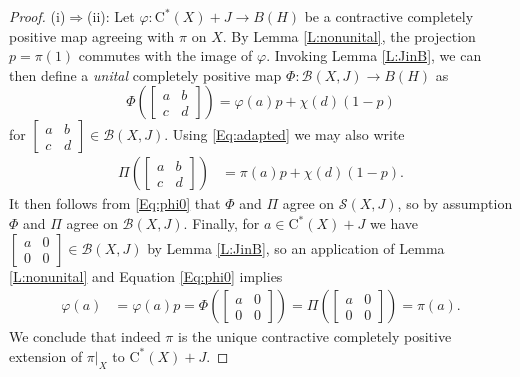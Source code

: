 \documentclass[10pt]{amsart}
\newcommand{\B}{{\mathcal{B}}}
\renewcommand{\S}{{\mathcal{S}}}
\newcommand{\rC}{\mathrm{C}}
\renewcommand{\phi}{\varphi}
\theoremstyle{definition}
\begin{document}
\begin{proof}
(i)$\Rightarrow$(ii):   Let $\phi:\rC^*(X)+J \to B(H)$ be a contractive completely positive map agreeing with $\pi$ on $X$. By Lemma \ref{L:nonunital}, the projection $p=\pi(1)$ commutes with the image of $\phi$.
Invoking Lemma \ref{L:JinB}, we can then define a \emph{unital} completely positive map $\Phi:\B(X,J)\to B(H)$ as
\begin{equation}\label{Eq:phi0}
\Phi\left(\begin{bmatrix}
a& b \\ c & d
\end{bmatrix}\right)=\phi(a)p+\chi(d)(1-p)
\end{equation}
 for $\begin{bmatrix}
a& b \\ c & d
\end{bmatrix}\in \B(X,J)$.
Using \eqref{Eq:adapted} we may also write
\begin{align*}
\Pi\left( \begin{bmatrix}
a& b \\ c & d
\end{bmatrix}\right)
&=\pi(a)p+\chi(d)(1-p).
\end{align*}
It then follows from \eqref{Eq:phi0} that $\Phi$ and $\Pi$ agree on $\S(X,J)$, so by assumption $\Phi$ and $\Pi$ agree on $\B(X,J)$. 
Finally, for $a\in \rC^*(X)+J$ we have $\begin{bmatrix}
a& 0 \\ 0 & 0
\end{bmatrix}\in  \B(X,J)$ by  Lemma \ref{L:JinB}, so an application of Lemma \ref{L:nonunital} and Equation \eqref{Eq:phi0} implies
\begin{align*}
\phi(a)&=\phi(a)p=\Phi\left(\begin{bmatrix}
a& 0 \\ 0 & 0
\end{bmatrix}\right)
=\Pi\left(\begin{bmatrix}
a& 0 \\ 0 & 0
\end{bmatrix}\right)=\pi(a).
\end{align*}
We conclude that indeed $\pi$ is the unique contractive completely positive extension of $\pi|_X$ to $\rC^*(X)+J$.
\end{proof}
\end{document}
